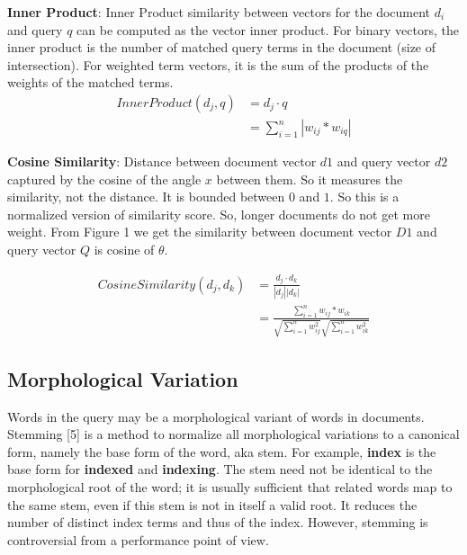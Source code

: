 \textbf{Inner Product}: Inner Product similarity between vectors for the document $d_i$ and query $q$ can be computed as the vector inner product. For binary vectors, the inner product is the number of matched query terms in the document (size of intersection). For weighted term vectors, it is the sum of the products of the weights of the matched terms.
\begin{equation} \label{eq:inner_prod}
\begin{split}
  Inner Product(d_j, q) & = d_j \cdot q \\
                           & = \sum_{i = 1}^{n} {|w_{ij} * w_{iq}|}
\end{split}
\end{equation}

\textbf{Cosine Similarity}: Distance between document vector ${d1}$ and query vector ${d2}$ captured by the cosine of the angle ${x}$ between them. So it measures the similarity, not the distance. It is bounded between $0$ and $1$. So this is a normalized version of similarity score. So, longer documents do not get more weight. From Figure 1 we get the similarity between document vector ${D1}$ and query vector ${Q}$ is cosine of ${θ}$.

\begin{equation}
\begin{split}
  Cosine Similarity(d_j, d_k) & = \frac{d_j \cdot d_k}{|d_j||d_k|} \\
                              & = \frac{\sum_{i = 1}^{n} {w_{ij} * w_{ik}}}{\sqrt{\sum_{i = 1}^{n} w_{ij}^2}\sqrt{\sum_{i = 1}^{n} w_{ik}^2}}
\end{split}
\end{equation}

\subsection{Morphological Variation}
Words in the query may be a morphological variant of words in documents. Stemming [5] is a
method to normalize all morphological variations to a canonical form, namely the base form of
the word, aka stem. For example, \textbf{index} is the base form for \textbf{indexed} and \textbf{indexing}. The stem need not be identical to the morphological root of the word; it is usually sufficient that related
words map to the same stem, even if this stem is not in itself a valid root. It reduces the number
of distinct index terms and thus of the index. However, stemming is controversial from a
performance point of view.